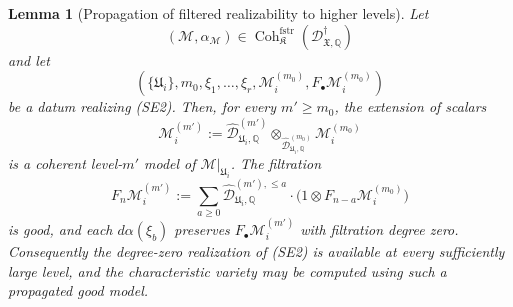 \documentclass[11pt]{amsart}
\theoremstyle{plain}
\newtheorem{lemma}{Lemma}[section]
\theoremstyle{definition}
\theoremstyle{remark}
\newcommand{\Coh}{\operatorname{Coh}}
\newcommand{\fstr}{\mathrm{fstr}}
\begin{document}
\begin{lemma}[Propagation of filtered realizability to higher levels]
\label{lem:level-propagation}
Let
\[
  (\mathcal M,\alpha_{\mathcal M})\in
  \Coh^{\fstr}_{\mathfrak K}
  (\mathscr D^\dagger_{\mathfrak X,\mathbb Q})
\]
and let
\[
  (\{\mathfrak U_i\},m_0,\xi_1,\ldots,\xi_r,
    \mathcal M_i^{(m_0)},F_\bullet\mathcal M_i^{(m_0)})
\]
be a datum realizing \textup{(SE2)}. Then, for every \(m'\ge m_0\), the
extension of scalars
\[
  \mathcal M_i^{(m')}:=
  \widehat{\mathscr D}^{(m')}_{\mathfrak U_i,\mathbb Q}
  \otimes_{\widehat{\mathscr D}^{(m_0)}_{\mathfrak U_i,\mathbb Q}}
  \mathcal M_i^{(m_0)}
\]
is a coherent level-\(m'\) model of \(\mathcal M|_{\mathfrak U_i}\). The
filtration
\[
  F_n\mathcal M_i^{(m')}
  :=
  \sum_{a\geq0}
  \widehat{\mathscr D}^{(m'),\leq a}_{\mathfrak U_i,\mathbb Q}
  \cdot
  \bigl(1\otimes F_{n-a}\mathcal M_i^{(m_0)}\bigr)
\]
is good, and each \(d\alpha(\xi_b)\) preserves
\(F_\bullet\mathcal M_i^{(m')}\) with filtration degree zero. Consequently the
degree-zero realization of \textup{(SE2)} is available at every sufficiently
large level, and the characteristic variety may be computed using such a
propagated good model.
\end{lemma}
\end{document}
